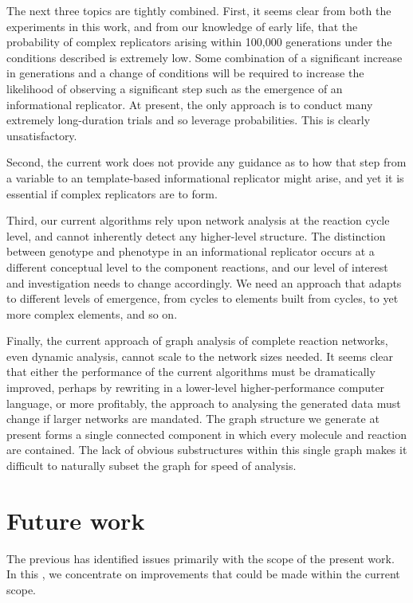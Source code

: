 The next three topics are tightly combined. First, it seems clear from both the experiments in this work, and from our knowledge of early life, that the probability of complex replicators arising within 100,000 generations under the conditions described is extremely low. Some combination of a significant increase in generations and a change of conditions will be required to increase the likelihood of observing a significant step such as the emergence of an informational replicator. At present, the only approach is to conduct many extremely long-duration trials and so leverage probabilities. This is clearly unsatisfactory.

Second, the current work does not provide any guidance as to how that step from a variable to an template-based informational replicator might arise, and yet it is essential if complex replicators are to form. 

Third, our current algorithms rely upon network analysis at the reaction cycle level, and cannot inherently detect any higher-level structure. The distinction between genotype and phenotype in an informational replicator occurs at a different conceptual level to the component reactions, and our level of interest and investigation needs to change accordingly. We need an approach that adapts to different levels of emergence, from cycles to elements built from cycles, to yet more complex elements, and so on. 

Finally, the current approach of graph analysis of complete reaction networks, even dynamic analysis, cannot scale to the network sizes needed. It seems clear that either the performance of the current algorithms must be dramatically improved, perhaps by rewriting in a lower-level higher-performance computer language, or more profitably, the approach to analysing the generated data must change if larger networks are mandated. The graph structure we generate at present forms a single connected component in which every molecule and reaction are contained. The lack of obvious substructures within this single graph makes it difficult to naturally subset the graph for speed of analysis.

\section{Future work}\label{sec:future-work}

The previous  has identified issues primarily with the scope of the present work. In this , we concentrate on improvements that could be made within the current scope. 

